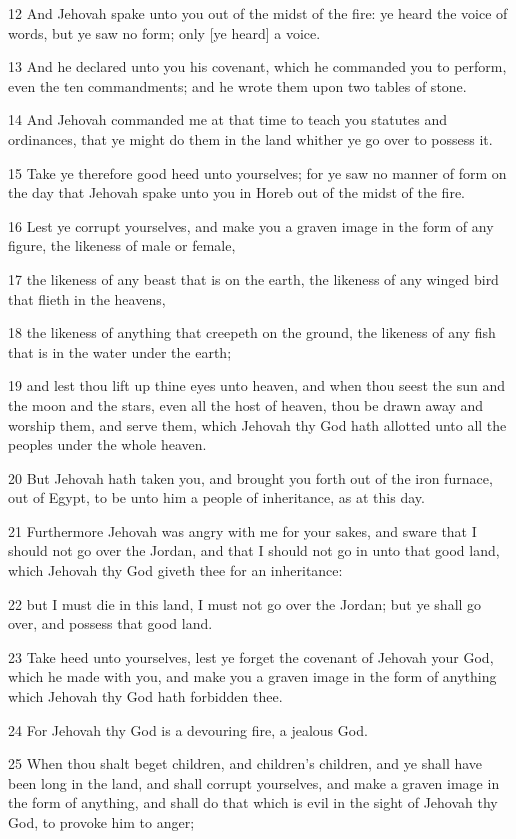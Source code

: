 \par 12 And Jehovah spake unto you out of the midst of the fire: ye heard the voice of words, but ye saw no form; only [ye heard] a voice.
\par 13 And he declared unto you his covenant, which he commanded you to perform, even the ten commandments; and he wrote them upon two tables of stone.
\par 14 And Jehovah commanded me at that time to teach you statutes and ordinances, that ye might do them in the land whither ye go over to possess it.
\par 15 Take ye therefore good heed unto yourselves; for ye saw no manner of form on the day that Jehovah spake unto you in Horeb out of the midst of the fire.
\par 16 Lest ye corrupt yourselves, and make you a graven image in the form of any figure, the likeness of male or female,
\par 17 the likeness of any beast that is on the earth, the likeness of any winged bird that flieth in the heavens,
\par 18 the likeness of anything that creepeth on the ground, the likeness of any fish that is in the water under the earth;
\par 19 and lest thou lift up thine eyes unto heaven, and when thou seest the sun and the moon and the stars, even all the host of heaven, thou be drawn away and worship them, and serve them, which Jehovah thy God hath allotted unto all the peoples under the whole heaven.
\par 20 But Jehovah hath taken you, and brought you forth out of the iron furnace, out of Egypt, to be unto him a people of inheritance, as at this day.
\par 21 Furthermore Jehovah was angry with me for your sakes, and sware that I should not go over the Jordan, and that I should not go in unto that good land, which Jehovah thy God giveth thee for an inheritance:
\par 22 but I must die in this land, I must not go over the Jordan; but ye shall go over, and possess that good land.
\par 23 Take heed unto yourselves, lest ye forget the covenant of Jehovah your God, which he made with you, and make you a graven image in the form of anything which Jehovah thy God hath forbidden thee.
\par 24 For Jehovah thy God is a devouring fire, a jealous God.
\par 25 When thou shalt beget children, and children's children, and ye shall have been long in the land, and shall corrupt yourselves, and make a graven image in the form of anything, and shall do that which is evil in the sight of Jehovah thy God, to provoke him to anger;
